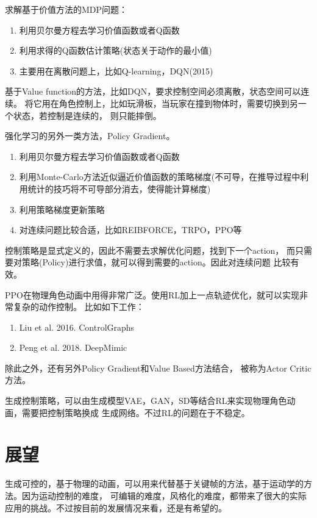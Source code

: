 \documentclass[lang=cn,newtx,10pt,scheme=chinese]{elegantbook}
\begin{document}
求解基于价值方法的MDP问题：
\begin{enumerate}
  \setlength{\itemindent}{2em}
  \item 利用贝尔曼方程去学习价值函数或者Q函数
  \item 利用求得的Q函数估计策略(状态关于动作的最小值)
  \item 主要用在离散问题上，比如Q-learning，DQN(2015)
\end{enumerate}

基于Value function的方法，比如DQN，要求控制空间必须离散，状态空间可以连续。
将它用在角色控制上，比如玩滑板，当玩家在撞到物体时，需要切换到另一个状态，若控制是连续的，
则只能摔倒。

强化学习的另外一类方法，Policy Gradient。
\begin{enumerate}
  \setlength{\itemindent}{2em}
  \item 利用贝尔曼方程去学习价值函数或者Q函数
  \item 利用Monte-Carlo方法近似逼近价值函数的策略梯度(不可导，在推导过程中利用统计的技巧将不可导部分消去，使得能计算梯度)
  \item 利用策略梯度更新策略
  \item 对连续问题比较合适，比如REIBFORCE，TRPO，PPO等
\end{enumerate}
控制策略是显式定义的，因此不需要去求解优化问题，找到下一个action，
而只需要对策略(Policy)进行求值，就可以得到需要的action。因此对连续问题
比较有效。

PPO在物理角色动画中用得非常广泛。使用RL加上一点轨迹优化，就可以实现非常复杂的动作控制。
比如如下工作：
\begin{enumerate}
  \setlength{\itemindent}{2em}
  \item Liu et al. 2016. ControlGraphs
  \item Peng et al. 2018. DeepMimic
\end{enumerate}

除此之外，还有另外Policy Gradient和Value Based方法结合，
被称为Actor Critic方法。

生成控制策略，可以由生成模型VAE，GAN，SD等结合RL来实现物理角色动画，需要把控制策略换成
生成网络。不过RL的问题在于不稳定。

\section{展望}
生成可控的，基于物理的动画，可以用来代替基于关键帧的方法，基于运动学的方法。因为运动控制的难度，
可编辑的难度，风格化的难度，都带来了很大的实际应用的挑战。不过按目前的发展情况来看，还是有希望的。
\end{document}
